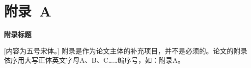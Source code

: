 \setlength{\baselineskip}{16pt}
\chapter{附录~A}

\begin{center}
\textbf{附录标题}
\end{center}

\indent
{}
[内容为五号宋体。] 附录是作为论文主体的补充项目，并不是必须的。论文的附录依序用大写正体英文字母A、B、C……编序号，如：附录A。